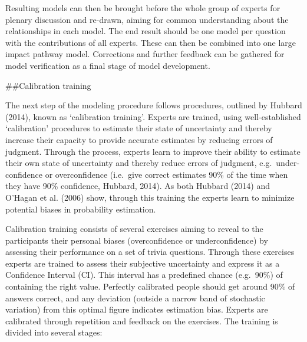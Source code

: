 \documentclass[
]{article}
\begin{document}
Resulting models can then be brought before the whole group of experts
for plenary discussion and re-drawn, aiming for common understanding
about the relationships in each model. The end result should be one
model per question with the contributions of all experts. These can then
be combined into one large impact pathway model. Corrections and further
feedback can be gathered for model verification as a final stage of
model development.

\#\#Calibration training

The next step of the modeling procedure follows procedures, outlined by
Hubbard (2014), known as `calibration training'. Experts are trained,
using well-established `calibration' procedures to estimate their state
of uncertainty and thereby increase their capacity to provide accurate
estimates by reducing errors of judgment. Through the process, experts
learn to improve their ability to estimate their own state of
uncertainty and thereby reduce errors of judgment, e.g.~under-confidence
or overconfidence (i.e.~give correct estimates 90\% of the time when
they have 90\% confidence, Hubbard, 2014). As both Hubbard (2014) and
O'Hagan et al. (2006) show, through this training the experts learn to
minimize potential biases in probability estimation.

Calibration training consists of several exercises aiming to reveal to
the participants their personal biases (overconfidence or
underconfidence) by assessing their performance on a set of trivia
questions. Through these exercises experts are trained to assess their
subjective uncertainty and express it as a Confidence Interval (CI).
This interval has a predefined chance (e.g.~90\%) of containing the
right value. Perfectly calibrated people should get around 90\% of
answers correct, and any deviation (outside a narrow band of stochastic
variation) from this optimal figure indicates estimation bias. Experts
are calibrated through repetition and feedback on the exercises. The
training is divided into several stages:
\end{document}
